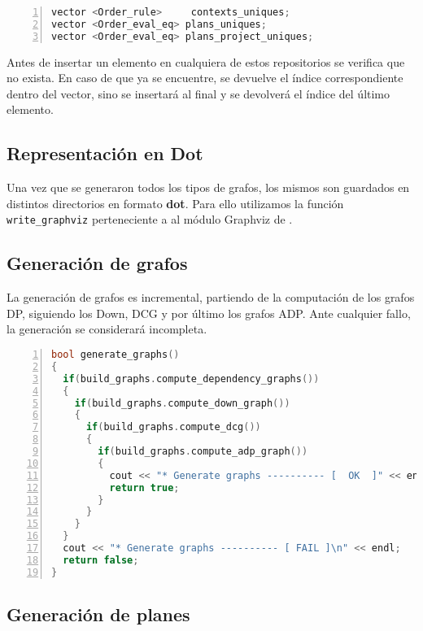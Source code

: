 \begin{lstlisting}[language=C++, basicstyle=\scriptsize, numbers=left, columns=fullflexible, linewidth=8cm]
vector <Order_rule>     contexts_uniques;
vector <Order_eval_eq> plans_uniques;
vector <Order_eval_eq> plans_project_uniques;
\end{lstlisting}

Antes de insertar un elemento en cualquiera de estos repositorios se verifica que no exista. En caso de que ya se encuentre, se devuelve el índice correspondiente dentro del vector, sino se insertará al final y se devolverá el índice del último elemento.

\subsection*{Representación en Dot}

Una vez que se generaron todos los tipos de grafos, los mismos son guardados en distintos directorios en formato \textbf{dot}\cite{dot}. Para ello utilizamos la función \texttt{write\_graphviz} perteneciente a al módulo Graphviz de \boost.

\subsection*{Generación de grafos}

La generación de grafos es incremental, partiendo de la computación de los grafos DP, siguiendo los Down, DCG y por último los grafos ADP. Ante cualquier fallo, la generación se considerará incompleta.

\begin{lstlisting}[language=C++, basicstyle=\scriptsize, numbers=left, columns=fullflexible, linewidth=10.5cm]
bool generate_graphs()
{
  if(build_graphs.compute_dependency_graphs())
  {
    if(build_graphs.compute_down_graph())
    {
      if(build_graphs.compute_dcg())
      {
        if(build_graphs.compute_adp_graph())
        {
          cout << "* Generate graphs ---------- [  OK  ]" << endl;
          return true;
        }
      }
    }
  }
  cout << "* Generate graphs ---------- [ FAIL ]\n" << endl;
  return false;
}
\end{lstlisting}
\vspace{0.3cm}

\subsection*{Generación de planes}

